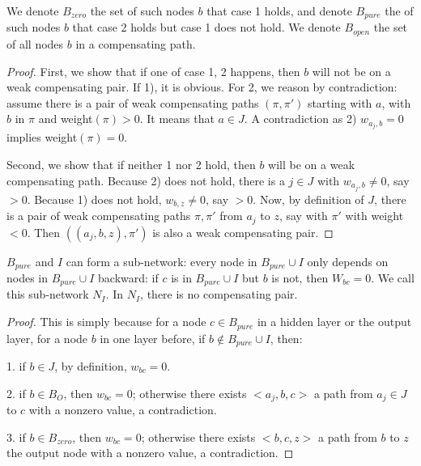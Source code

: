 					We denote $B_{zero}$ the set of such nodes $b$ that case 1 holds, and denote $B_{pure}$ the of such nodes $b$ that case 2 holds but case 1 does not hold.	We denote $B_{open}$ the set of all nodes $b$ in a compensating path.
				
				\begin{proof}
					First, we show that if one of case 1, 2 happens, then $b$ will not be on a weak compensating pair. If 1), it is obvious. For 2, we reason by contradiction: assume there is a pair of weak compensating paths 	$(\pi,\pi')$ starting with $a$, with $b$ in $\pi$ and weight$(\pi) > 0$. It means that $a \in J$. A contradiction as 2) $w_{a_j,b}=0$ implies weight$(\pi)=0$.
					
					Second, we show that if neither 1 nor 2 hold, then $b$ will be on a weak compensating path.
					Because 2) does not hold, there is a $j \in J$ with $w_{a_j,b} \neq 0$, say $>0$.
					Because 1) does not hold, $w_{b,z} \neq 0$, say $>0$.
					Now, by definition of $J$, there is a pair of weak compensating paths $\pi,\pi'$ 
					from $a_j$ to $z$, say with $\pi'$ with weight $<0$.
					Then $((a_j,b,z), \pi')$ is also a weak compensating pair.
				\end{proof}
				
				\begin{lemma}\label{lem:subnetwork}
					$B_{pure}$ and $I$ can form a sub-network: every node in $B_{pure}\cup I$ only depends on nodes in $B_{pure}\cup I$ backward: if $c$ is in $B_{pure}\cup I$ but $b$ is not, then $W_{bc}=0$. We call this sub-network $N_I$. In $N_I$, there is no compensating pair.
				\end{lemma}
				
				\begin{proof}
					This is simply because for a node $c\in B_{pure}$ in a hidden layer or the output layer, for a node $b$ in one layer before, if $b\notin B_{pure}\cup I$, then:
					
					1. if $b\in J$, by definition, $w_{bc}=0$.
					
					2. if $b\in B_{O}$, then $w_{bc}=0$; otherwise there exists $<a_j,b,c>$ a path from $a_j\in J$ to $c$ with a nonzero value, a contradiction.
					
					3. if $b\in B_{zero}$, then $w_{bc}=0$; otherwise there exists $<b,c,z>$ a path from $b$ to $z$ the output node with a nonzero value, a contradiction.
				\end{proof}
				
				
				
